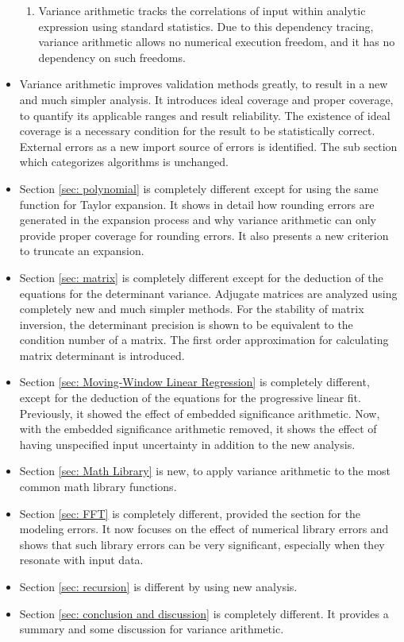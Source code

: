 \documentclass[twoside]{article}
\numberwithin{equation}{section}
\begin{document}
\begin{itemize}
\begin{enumerate}
\item Variance arithmetic tracks the correlations of input within analytic expression using standard statistics.
Due to this dependency tracing, variance arithmetic allows no numerical execution freedom, and it has no dependency on such freedoms.

\end{enumerate}

\item Variance arithmetic improves validation methods greatly, to result in a new and much simpler analysis. 
It introduces ideal coverage and proper coverage, to quantify its applicable ranges and result reliability.
The existence of ideal coverage is a necessary condition for the result to be statistically correct.
External errors as a new import source of errors is identified.
The sub section which categorizes algorithms is unchanged.

\item Section \ref{sec: polynomial} is completely different except for using the same function for Taylor expansion.
It shows in detail how rounding errors are generated in the expansion process and why variance arithmetic can only provide proper coverage for rounding errors.
It also presents a new criterion to truncate an expansion.

\item Section \ref{sec: matrix} is completely different except for the deduction of the equations for the determinant variance.
Adjugate matrices are analyzed using completely new and much simpler methods.
For the stability of matrix inversion, the determinant precision is shown to be equivalent to the condition number of a matrix.
The first order approximation for calculating matrix determinant is introduced.

\item Section \ref{sec: Moving-Window Linear Regression} is completely different, except for the deduction of the equations for the progressive linear fit. 
Previously, it showed the effect of embedded significance arithmetic.
Now, with the embedded significance arithmetic removed, it shows the effect of having unspecified input uncertainty in addition to the new analysis.

\item Section \ref{sec: Math Library} is new, to apply variance arithmetic to the most common math library functions.

\item Section \ref{sec: FFT} is completely different, provided the section for the modeling errors.  
It now focuses on the effect of numerical library errors and shows that such library errors can be very significant, especially when they resonate with input data.

\item Section \ref{sec: recursion} is different by using new analysis.

\item Section \ref{sec: conclusion and discussion} is completely different.
It provides a summary and some discussion for variance arithmetic.

\end{itemize}
\end{document}
